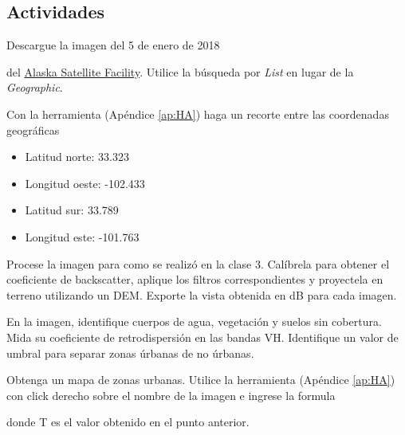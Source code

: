 
\subsection{Actividades}

\begin{que}
    Descargue la imagen del 5 de enero de 2018
    \begin{center}\end{center}
      del \href{https://vertex.daac.asf.alaska.edu/}{Alaska Satellite Facility}. Utilice la búsqueda por \emph{List} en lugar de la \emph{Geographic}.
\end{que}

\begin{que}
    Con la herramienta  (Apéndice \ref{ap:HA}) haga un recorte entre las coordenadas geográficas
    \begin{itemize}
        \item Latitud norte: 33.323
        \item Longitud oeste: -102.433
        \item Latitud sur: 33.789
        \item Longitud este: -101.763
    \end{itemize}
\end{que}

\begin{que}
    Procese la imagen para como se realizó en la clase 3. Calíbrela para obtener el coeficiente de backscatter, aplique los filtros correspondientes y proyectela en terreno utilizando un DEM. Exporte la vista obtenida en dB para cada imagen.
\end{que}

\begin{que}
    En la imagen, identifique cuerpos de agua, vegetación y suelos sin cobertura. Mida su coeficiente de retrodispersión en las bandas VH. Identifique un valor de umbral para separar zonas úrbanas de no úrbanas.
\end{que}

\begin{que}
  Obtenga un mapa de zonas urbanas. Utilice la herramienta  (Apéndice \ref{ap:HA}) con click derecho sobre el nombre de la imagen e ingrese la formula
  \begin{center}
  \end{center}
  donde T es el valor obtenido en el punto anterior.
\end{que}

